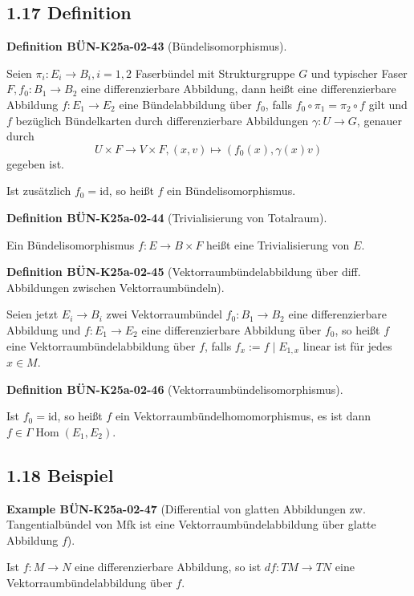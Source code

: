 \documentclass[10pt, letterpaper]{article}
\newcommand{\CustomHeading}[3]{%
  \par\medskip\noindent%
  \textbf{#1 #2} \textnormal{(#3)}.\enskip%
}
\newenvironment{DEF}[2]{\begin{unitbox}\CustomHeading{Definition}{#1}{#2}}{\end{unitbox}}
\newenvironment{EXA}[2]{\begin{unitbox}\CustomHeading{Example}{#1}{#2}}{\end{unitbox}}
\begin{document}
\subsection*{1.17 Definition}


\begin{DEF}{BÜN-K25a-02-43}{Bündelisomorphismus}
Seien $\pi_{i}: E_{i} \rightarrow B_{i}, i=1,2$ Faserbündel mit Strukturgruppe $G$ und typischer Faser $F, f_{0}: B_{1} \rightarrow B_{2}$ eine differenzierbare Abbildung, dann heißt eine differenzierbare Abbildung $f: E_{1} \rightarrow E_{2}$ eine Bündelabbildung über $f_{0}$, falls $f_{0} \circ \pi_{1}=\pi_{2} \circ f$ gilt und $f$ bezüglich Bündelkarten durch differenzierbare Abbildungen $\gamma: U \rightarrow G$, genauer durch
$$
U \times F \rightarrow V \times F,(x, v) \mapsto\left(f_{0}(x), \gamma(x) v\right)
$$
gegeben ist.

Ist zusätzlich $f_{0}=\mathrm{id}$, so heißt $f$ ein Bündelisomorphismus.
\end{DEF}

\begin{DEF}{BÜN-K25a-02-44}{Trivialisierung von Totalraum}
Ein Bündelisomorphismus $f: E \rightarrow B \times F$ heißt eine Trivialisierung von $E$.
\end{DEF}


\begin{DEF}{BÜN-K25a-02-45}{Vektorraumbündelabbildung über diff. Abbildungen zwischen Vektorraumbündeln}
Seien jetzt $E_{i} \rightarrow B_{i}$ zwei Vektorraumbündel $f_{0}: B_{1} \rightarrow B_{2}$ eine differenzierbare Abbildung und $f: E_{1} \rightarrow E_{2}$ eine differenzierbare Abbildung über $f_{0}$, so heißt $f$ eine Vektorraumbündelabbildung über $f$, falls $f_{x}:=f \mid E_{1, x}$ linear ist für jedes $x \in M$.
\end{DEF}


\begin{DEF}{BÜN-K25a-02-46}{Vektorraumbündelisomorphismus}
Ist $f_{0}=\mathrm{id}$, so heißt $f$ ein Vektorraumbündelhomomorphismus, es ist dann $f \in \Gamma \operatorname{Hom}\left(E_{1}, E_{2}\right)$.
\end{DEF}

\subsection*{1.18 Beispiel}


\begin{EXA}{BÜN-K25a-02-47}{Differential von glatten Abbildungen zw. Tangentialbündel von Mfk ist eine Vektorraumbündelabbildung über glatte Abbildung $f$}
Ist $f: M \rightarrow N$ eine differenzierbare Abbildung, so ist $d f: T M \rightarrow T N$ eine Vektorraumbündelabbildung über $f$.
\end{EXA}
\end{document}

